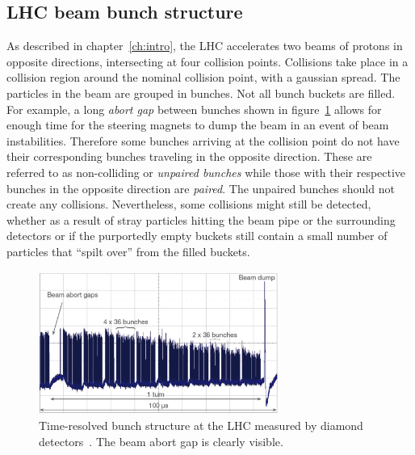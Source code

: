 \subsection{LHC beam bunch structure}
As described in chapter~\ref{ch:intro}, the LHC accelerates two beams of protons in opposite directions, intersecting at four collision points. Collisions take place in a collision region around the nominal collision point, with a gaussian spread. The particles in the beam are grouped in bunches. Not all bunch buckets are filled. For example, a long \emph{abort gap} between bunches shown in figure~\ref{fig:lhcbunch} allows for enough time for the steering magnets to dump the beam in an event of beam instabilities. Therefore some bunches arriving at the collision point do not have their corresponding bunches traveling in the opposite direction. These are referred to as non-colliding or \emph{unpaired bunches} while those with their respective bunches in the opposite direction are \emph{paired}. The unpaired bunches should not create any collisions. Nevertheless, some collisions might still be detected, whether as a result of stray particles hitting the beam pipe or the surrounding detectors or if the purportedly empty buckets still contain a small number of particles that ``spilt over'' from the filled buckets.
\begin{figure}[!t]
\centering
\includegraphics[width=0.7\textwidth]{04_charge_monitoring/pics/lhcbunch}
\caption{Time-resolved bunch structure at the LHC measured by diamond detectors~\cite{GRIES:00005}. The beam abort gap is clearly visible.}
\label{fig:lhcbunch}
\end{figure}

